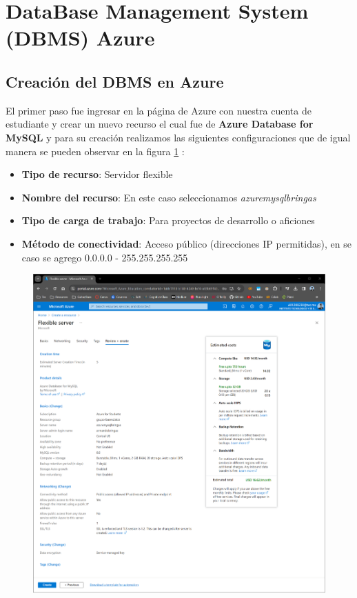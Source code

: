 \documentclass[12pt,a4paper]{article}
\begin{document}
\vspace{10em}

\section{DataBase Management System (DBMS) Azure}

\subsection{Creación del DBMS en Azure}

El primer paso fue ingresar en la página de Azure con nuestra cuenta de estudiante y crear un nuevo recurso el cual fue de \textbf{Azure Database for MySQL} y para su creación realizamos las siguientes configuraciones que de igual manera se pueden observar en la figura \ref{fig:1_1_1_Azure_DBMS} :

\begin{itemize}
    \item \textbf{Tipo de recurso}: Servidor flexible
    \item \textbf{Nombre del recurso}: En este caso seleccionamos  \textit{azuremysqlbringas}
    \item \textbf{Tipo de carga de trabajo}: Para proyectos de desarrollo o aficiones
    \item \textbf{Método de conectividad}: Acceso público (direcciones IP permitidas), en se caso se agrego 0.0.0.0 - 255.255.255.255
\end{itemize}

\begin{figure}[H]
    \centering
    \includegraphics[width=.7\linewidth]{M4_Servicios_Cómputo_en_la_Nube/Tarea_6_Creación_sistema_administración_Base_de_Datos/reporte/figuras/1_1_1_Azure_DBMS.png}
    \label{fig:1_1_1_Azure_DBMS}
\end{figure}
\end{document}
